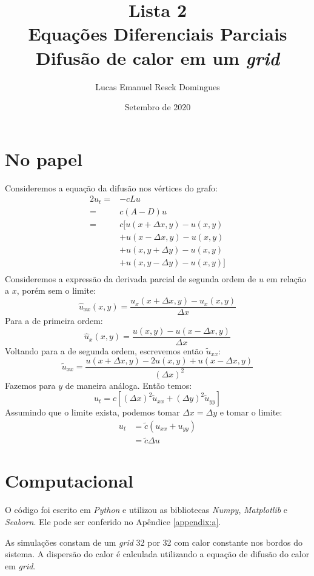 \documentclass{article}
\title{Lista 2 \\
\large Equações Diferenciais Parciais \\
Difusão de calor em um \textit{grid}}
\author{Lucas Emanuel Resck Domingues}
\date{Setembro de 2020}
\begin{document}
    \maketitle
    
    \section*{No papel}

        Consideremos a equação da difusão nos vértices do grafo:
        \begin{alignat*}{2}
            u_t =& -cLu \\
            =& c(A-D)u \\
            =&c[u(x+\Delta x, y)-u(x, y) \\
            &+u(x-\Delta x, y)-u(x, y) \\
            &+u(x, y+\Delta y)-u(x, y) \\
            &+u(x, y-\Delta y)-u(x, y)] \\
        \end{alignat*}
        Consideremos a expressão da derivada parcial de segunda ordem
        de $u$ em relação a $x$, porém sem o limite:
        $$\hat{u}_{xx}(x, y) = \dfrac{u_x(x + \Delta x, y) - u_x(x, y)}{\Delta x}$$
        Para a de primeira ordem:
        $$\hat{u}_{x}(x, y) = \dfrac{u(x, y) - u(x - \Delta x, y)}{\Delta x}$$
        Voltando para a de segunda ordem, escrevemos então $\widetilde{u}_{xx}$:
        $$\widetilde{u}_{xx} = \dfrac{u(x+\Delta x, y)-2u(x, y)+u(x-\Delta x, y)}{(\Delta x)^2}$$
        Fazemos para $y$ de maneira análoga. Então temos:
        $$u_t = c[(\Delta x)^2\widetilde{u}_{xx} + (\Delta y)^2\widetilde{u}_{yy}]$$
        Assumindo que o limite exista, podemos tomar $\Delta x = \Delta y$ e tomar o limite:
        \begin{align*}
            u_t &= \widetilde{c}(u_{xx} + {u_{yy}}) \\
            &= \widetilde{c} \Delta u
        \end{align*}

    \section*{Computacional}

        O código foi escrito em \textit{Python} e utilizou as bibliotecas \textit{Numpy}, \textit{Matplotlib} e \textit{Seaborn}. Ele pode ser conferido no Apêndice \ref{appendix:a}.

        As simulações constam de um \textit{grid} 32 por 32 com calor constante nos bordos do sistema.
        A dispersão do calor é calculada utilizando a equação de difusão do calor em \textit{grid}.
\end{document}
